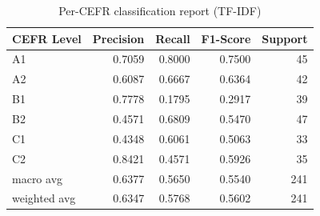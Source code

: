 \begin{table}[htbp]
\centering
\caption{Per-CEFR classification report (TF-IDF)}
\label{tab:classification_report_tfidf}
\begin{tabular}{lrrrr}
\toprule
CEFR Level & Precision & Recall & F1-Score & Support \\
\midrule
A1 & 0.7059 & 0.8000 & 0.7500 & 45 \\
A2 & 0.6087 & 0.6667 & 0.6364 & 42 \\
B1 & 0.7778 & 0.1795 & 0.2917 & 39 \\
B2 & 0.4571 & 0.6809 & 0.5470 & 47 \\
C1 & 0.4348 & 0.6061 & 0.5063 & 33 \\
C2 & 0.8421 & 0.4571 & 0.5926 & 35 \\
macro avg & 0.6377 & 0.5650 & 0.5540 & 241 \\
weighted avg & 0.6347 & 0.5768 & 0.5602 & 241 \\
\bottomrule
\end{tabular}
\end{table}
